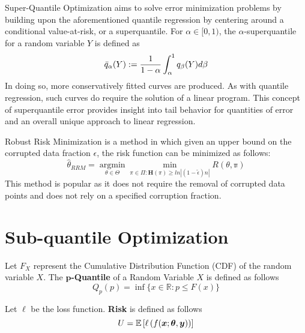 \documentclass{article} %
\begin{document}
	Super-Quantile Optimization \cite{ROCKAFELLAR2014140} aims to solve error minimization problems by building upon the aforementioned quantile regression by centering around a conditional value-at-risk, or a superquantile. For $\alpha \in [0,1)$, the $\alpha$-superquantile for a random variable $Y$ is defined as \begin{equation}
		\Bar{q}_\alpha (Y) := \frac{1}{1-\alpha} \int_\alpha^1 q_\beta (Y) d\beta
	\end{equation}
	In doing so, more conservatively fitted curves are produced. As with quantile regression, such curves do require the solution of a linear program.
	This concept of superquantile error provides insight into tail behavior for quantities of error and an overall unique approach to linear regression.
	
	Robust Risk Minimization \cite{RRM} is a method in which given an upper bound on the corrupted data fraction $\epsilon$, the risk function can be minimized as follows:
	\begin{equation}
		\hat{\mathbb{\theta}}_{RRM} = \operatorname*{argmin}_{\theta \in \Theta} \operatorname*{min}_{\pi \in \Pi: \mathbf{H}(\pi) \geq ln|(1-\tilde{\epsilon})n|} R(\mathbb{\theta,\pi})
	\end{equation}
	This method is popular as it does not require the removal of corrupted data points and does not rely on a specified corruption fraction.
		
	\section{Sub-quantile Optimization}
	\label{sec:sub-quantile-optimization}
	
	\begin{definition}
		Let $F_X$ represent the Cumulative Distribution Function (CDF) of the random variable $X$. The \textbf{$\mathbf{p}$-Quantile} of a Random Variable $X$ is defined as follows \vspace{1em}
		\begin{equation}
			Q_p(p) = \inf\{x\in\mathbb{R}: p \leq F(x)\} 
		\end{equation}
	\end{definition}
	
	\begin{definition}
		Let $\ell$ be the loss function. \textbf{Risk} is defined as follows
		\begin{equation}
			U = \mathbb{E}\left[\ell \left( f({\bm{x}};{\bm{\theta}},{\bm{y}})\right)\right]
		\end{equation}
	\end{definition}
	
\end{document}
